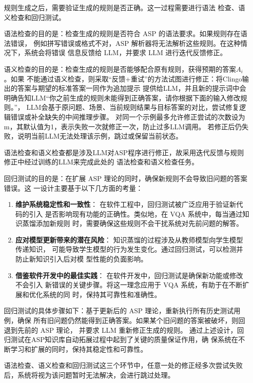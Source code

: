 规则生成之后，需要验证生成的规则是否正确。这一过程需要进行语法
检查、语义检查和回归测试。

语法检查的目的是：检查生成的规则是否符合 ASP 的语法要求。如果规则存在语法错误，
例如拼写错误或格式不对，ASP 解析器将无法解析这些规则。在这种情况下，系统会将错误
信息反馈给 LLM，并要求 LLM 进行迭代反馈修正。

语义检查的目的是：检查生成的规则是否能够配合原有规则，获得预期的答案$A_i$。如果
不能通过语义检查，则采取“反馈+重试”的方法试图进行修正：将Clingo输出的答案与期望的标准答案一同作为追加提示
提供给LLM，并且新的提示词中会明确告知LLM“你之前生成的规则未能得到正确答案，请你根据下面的输入修改规则。”，
LLM会基于原问题、场景、当前规则结果与目标答案的对比，尝试修复逻辑错误或补全缺失的中间推理步骤。
对同一个示例最多允许修正尝试的次数设为m，其默认值为1，表示失败一次就修正一次，防止过多LLM调用。
若修正后仍失败，说明当前LLM无法处理该示例，跳过或保留当前状态。

语法检查和语义检查都是涉及LLM对ASP程序进行修正，故采用迭代反馈与规则修正中经过训练的LLM来完成此处的
语法检查和语义检查任务。

回归测试的目的是：在扩展 ASP 理论的同时，确保新规则不会导致旧问题的答案错误。这
一设计主要基于以下几方面的考量：
\begin{enumerate}[itemsep=0pt,parsep=0pt]
\item \textbf{维护系统稳定性和一致性}： 在软件工程中，回归测试被广泛应用于验证新代码的引入
是否影响现有功能的正确性。类似地，在 VQA 系统中，每当通过知识蒸馏添加新规则
时，需要确保这些规则不会干扰系统对先前问题的解答。
\item \textbf{应对模型更新带来的潜在风险}： 知识蒸馏的过程涉及从教师模型向学生模型传递知识，
可能导致学生模型的行为发生变化。通过回归测试，可以检测并防止新知识引入后对模
型性能的负面影响。
\item \textbf{借鉴软件开发中的最佳实践}： 在软件开发中，回归测试是确保新功能或修改不会引入
新错误的关键步骤。将这一理念应用于 VQA 系统，有助于在不断扩展和优化系统的同
时，保持其可靠性和准确性。
\end{enumerate}

回归测试的具体步骤如下：基于更新后的 ASP 理论，重新执行所有历史测试用例，确保
所有旧问题仍然能得到正确答案。如果某个旧问题的答案被破坏，则回退到先前的 ASP 理论，
并要求 LLM 重新修正生成的规则。
通过上述设计，回归测试在ASP知识库自动拓展过程中起到了关键的质量保证作用，确
保系统在不断学习和扩展的同时，保持其稳定性和可靠性。

语法检查、语义检查和回归测试这三个环节中，任意一处的修正经多次尝试失败后，系统将视为该问题暂时无法解决，会进行跳过处理。
